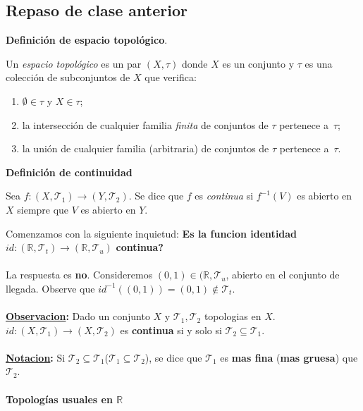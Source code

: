 \subsection{Repaso de clase anterior}
\textbf{Definición de espacio topológico}.

Un \emph{espacio topológico} es un par $(X,\tau)$ donde $X$ es un conjunto y $\tau$ es una colección de subconjuntos de $X$ que verifica:
\begin{enumerate}[]
  \item $\emptyset\in\tau$ y $X\in\tau$;
  \item la intersección de cualquier familia \emph{finita} de
        conjuntos de $\tau$ pertenece a~$\tau$;
  \item la unión de cualquier familia (arbitraria) de conjuntos de
        $\tau$ pertenece a~$\tau$.
\end{enumerate}

\textbf{Definición de continuidad}

Sea $f\colon(X,\mathcal T_1)\to(Y,\mathcal T_2)$. Se dice que $f$ es \emph{continua} si $f^{-1}(V)$ es abierto en $X$ siempre que $V$ es abierto en $Y$.

Comenzamos con la siguiente inquietud: \textbf{Es la funcion identidad} \( id: (\mathbb{R}, \mathscr{T}_t) \to (\mathbb{R}, \mathscr{T}_u)  \) \textbf{continua?} \\ \\
La respuesta es \textbf{no}. Consideremos \( (0,1) \in (\mathbb{R}, \mathscr{T}_u \), abierto en el conjunto de llegada. Observe que \( id^{-1}((0,1))=(0,1) \notin \mathscr{T}_t \). \\ \\
\textbf{\underline{Observacion}:} Dado un conjunto \(X\) y \( \mathscr{T}_1, \mathscr{T}_2 \) topologias en \(X\). \( id: (X, \mathscr{T}_1) \to (X, \mathscr{T}_2) \) es \textbf{continua} si y solo si \( \mathscr{T}_2 \subseteq \mathscr{T}_1 \). \\ \\
\textbf{\underline{Notacion}:} Si \( \mathscr{T}_2 \subseteq \mathscr{T}_1 \)($\mathscr{T}_1 \subseteq \mathscr{T}_2$), se dice que \( \mathscr{T}_1 \) es \textbf{mas fina} (\textbf{mas gruesa}) que \( \mathscr{T}_2 \). \\ \\

\textbf{Topologías usuales en $\mathbb{R}$}

